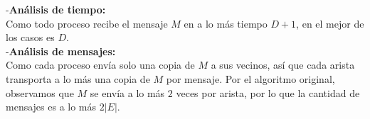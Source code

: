 -\textbf{Análisis de tiempo:} \\
Como todo proceso recibe el mensaje $M$ en a lo más tiempo $D+1$, en el mejor de los
casos es $D$.\\
-\textbf{Análisis de mensajes:} \\
Como cada proceso envía solo una copia de $M$ a sus vecinos,
así que cada arista transporta a lo más una copia de $M$ por mensaje. Por el
algoritmo original, observamos que $M$ se envía a lo más $2$ veces por arista,
por lo que la cantidad de mensajes es a lo más $2|E|$.
